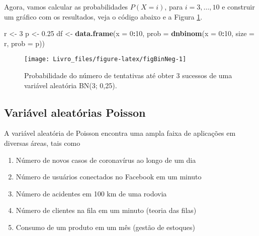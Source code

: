 \documentclass[]{book}
\newenvironment{Shaded}{\begin{snugshade}}{\end{snugshade}}
\newcommand{\DataTypeTok}[1]{\textcolor[rgb]{0.13,0.29,0.53}{#1}}
\newcommand{\DecValTok}[1]{\textcolor[rgb]{0.00,0.00,0.81}{#1}}
\newcommand{\FloatTok}[1]{\textcolor[rgb]{0.00,0.00,0.81}{#1}}
\newcommand{\KeywordTok}[1]{\textcolor[rgb]{0.13,0.29,0.53}{\textbf{#1}}}
\newcommand{\NormalTok}[1]{#1}
\newcommand{\OperatorTok}[1]{\textcolor[rgb]{0.81,0.36,0.00}{\textbf{#1}}}
\newcommand{\StringTok}[1]{\textcolor[rgb]{0.31,0.60,0.02}{#1}}
\providecommand{\tightlist}{%
  \setlength{\itemsep}{0pt}\setlength{\parskip}{0pt}}
\theoremstyle{definition}
\theoremstyle{definition}
\theoremstyle{definition}
\theoremstyle{remark}
\begin{document}
Agora, vamos calcular as probabilidades \(P(X=i)\), para \(i=3, \ldots, 10\) e construir um gráfico com os resultados, veja o código abaixo e a Figura \ref{fig:figBinNeg}.

\begin{Shaded}
\begin{Highlighting}[]
\NormalTok{r <-}\StringTok{ }\DecValTok{3}
\NormalTok{p <-}\StringTok{ }\FloatTok{0.25}
\NormalTok{df <-}\StringTok{ }\KeywordTok{data.frame}\NormalTok{(}\DataTypeTok{x =} \DecValTok{0}\OperatorTok{:}\DecValTok{10}\NormalTok{, }
                 \DataTypeTok{prob =} \KeywordTok{dnbinom}\NormalTok{(}\DataTypeTok{x =} \DecValTok{0}\OperatorTok{:}\DecValTok{10}\NormalTok{, }\DataTypeTok{size =}\NormalTok{ r, }\DataTypeTok{prob =}\NormalTok{ p))}
\end{Highlighting}
\end{Shaded}

\begin{figure}

{\centering \texttt{[image: Livro\_files/figure-latex/figBinNeg-1]} 

}

\caption{Probabilidade do número de tentativas até obter 3 sucessos de uma variável aleatória BN(3; 0,25).}\label{fig:figBinNeg}
\end{figure}

\hypertarget{variuxe1vel-aleatuxf3rias-poisson}{%
\subsection{Variável aleatórias Poisson}\label{variuxe1vel-aleatuxf3rias-poisson}}

A variável aleatória de Poisson encontra uma ampla faixa de aplicações em diversas áreas, tais como

\begin{enumerate}
\def\labelenumi{\arabic{enumi}.}
\tightlist
\item
  Número de novos casos de coronavírus ao longo de um dia
\item
  Número de usuários conectados no Facebook em um minuto
\item
  Número de acidentes em 100 km de uma rodovia
\item
  Número de clientes na fila em um minuto (teoria das filas)
\item
  Consumo de um produto em um mês (gestão de estoques)
\end{enumerate}
\end{document}
